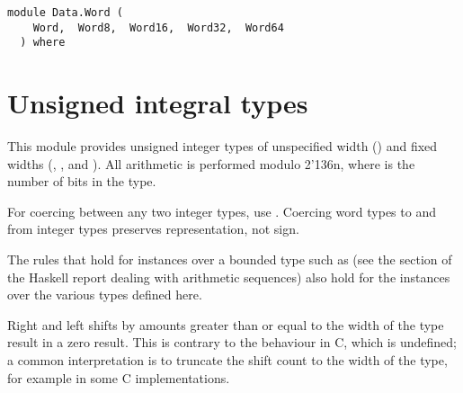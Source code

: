 \label{module:Data.Word}
\haddockbeginheader
{\haddockverb\begin{verbatim}
module Data.Word (
    Word,  Word8,  Word16,  Word32,  Word64
  ) where\end{verbatim}}
\haddockendheader

\section{Unsigned integral types
}
This module provides unsigned integer types of unspecified width ()
and fixed widths (, ,  and ).  All
arithmetic is performed modulo 2{\char '136}n, where  is the number of bits in
the type.
\par
For coercing between any two integer types, use
.  Coercing word types to and from integer
types preserves representation, not sign.
\par
The rules that hold for  instances over a bounded type
such as  (see the section of the Haskell report dealing
with arithmetic sequences) also hold for the  instances
over the various  types defined here.
\par
Right and left shifts by amounts greater than or equal to the width of
the type result in a zero result.  This is contrary to the behaviour
in C, which is undefined; a common interpretation is to truncate the
shift count to the width of the type, for example  in
some C implementations.
\par

